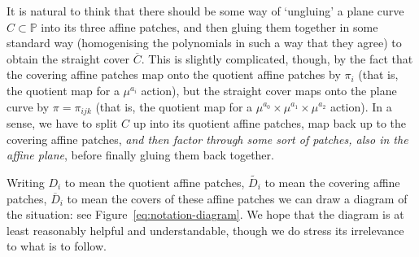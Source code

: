 \documentclass[10pt,notitlepage]{article}
\numberwithin{equation}{subsection}
\newcommand{\pee}{\mathbb{P}}
\newcommand{\cover}[1]{\overline{#1}}
\newcommand{\othercover}[1]{\widetilde{#1}}
\begin{document}
        It is natural to think that there should be some way of `ungluing' a plane curve $C\subset\pee$ into its three affine patches, and then gluing them together in some standard way (homogenising the polynomials in such a way that they agree) to obtain the straight cover $\cover{C}$.
        This is slightly complicated, though, by the fact that the covering affine patches map onto the quotient affine patches by $\pi_i$ (that is, the quotient map for a $\mu^{a_i}$ action), but the straight cover maps onto the plane curve by $\pi=\pi_{ijk}$ (that is, the quotient map for a $\mu^{a_0}\times\mu^{a_1}\times\mu^{a_2}$ action).
        In a sense, we have to split $C$ up into its quotient affine patches, map back up to the covering affine patches, \emph{and then factor through some sort of patches, also in the affine plane}, before finally gluing them back together.

        Writing $D_i$ to mean the quotient affine patches, $\othercover{D_i}$ to mean the covering affine patches, $\cover{D}_i$ to mean the covers of these affine patches we can draw a diagram of the situation: see Figure~\ref{eq:notation-diagram}.
        We hope that the diagram is at least reasonably helpful and understandable, though we do stress its irrelevance to what is to follow.
\end{document}
